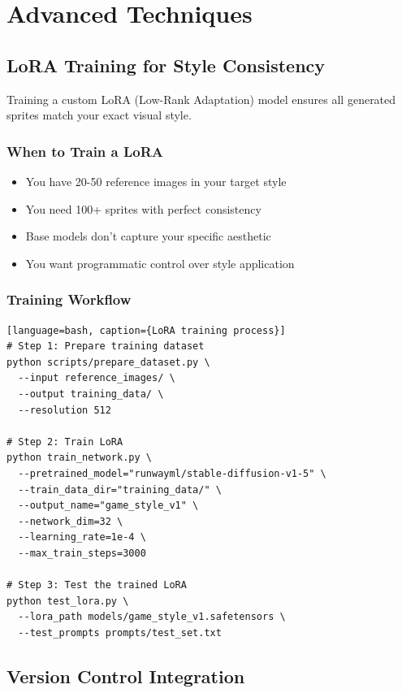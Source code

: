 \documentclass[11pt]{article}
\begin{document}
\section{Advanced Techniques}

\subsection{LoRA Training for Style Consistency}

Training a custom LoRA (Low-Rank Adaptation) model ensures all generated sprites match your exact visual style.

\subsubsection{When to Train a LoRA}

\begin{itemize}
    \item You have 20-50 reference images in your target style
    \item You need 100+ sprites with perfect consistency
    \item Base models don't capture your specific aesthetic
    \item You want programmatic control over style application
\end{itemize}

\subsubsection{Training Workflow}

\begin{verbatim}[language=bash, caption={LoRA training process}]
# Step 1: Prepare training dataset
python scripts/prepare_dataset.py \
  --input reference_images/ \
  --output training_data/ \
  --resolution 512

# Step 2: Train LoRA
python train_network.py \
  --pretrained_model="runwayml/stable-diffusion-v1-5" \
  --train_data_dir="training_data/" \
  --output_name="game_style_v1" \
  --network_dim=32 \
  --learning_rate=1e-4 \
  --max_train_steps=3000

# Step 3: Test the trained LoRA
python test_lora.py \
  --lora_path models/game_style_v1.safetensors \
  --test_prompts prompts/test_set.txt
\end{verbatim}

\subsection{Version Control Integration}
\end{document}
